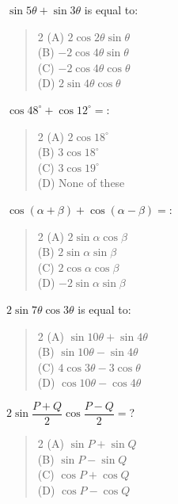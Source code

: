 \documentclass[11pt,a4paper]{article}
\begin{document}
\begin{mcqlist}
\item $\sin5\theta+\sin3\theta$ is equal to:
\begin{quote}\begin{multicols}{2}
\noindent (A) $2\cos2\theta\sin\theta$ \\
(B) $-2\cos4\theta\sin\theta$ \\
(C) $-2\cos4\theta\cos\theta$ \\
(D) $2\sin4\theta\cos\theta$
\end{multicols}\end{quote}

\item $\cos48^{\circ}+\cos12^{\circ} = $:
\begin{quote}\begin{multicols}{2}
\noindent (A) $2\cos18^{\circ}$ \\
(B) $3\cos18^{\circ}$ \\
(C) $3\cos19^{\circ}$ \\
(D) None of these
\end{multicols}\end{quote}

\item $\cos(\alpha+\beta)+\cos(\alpha-\beta) = $:
\begin{quote}\begin{multicols}{2}
\noindent (A) $2\sin\alpha\cos\beta$ \\
(B) $2\sin\alpha\sin\beta$ \\
(C) $2\cos\alpha\cos\beta$ \\
(D) $-2\sin\alpha\sin\beta$
\end{multicols}\end{quote}

\item $2\sin7\theta\cos3\theta$ is equal to:
\begin{quote}\begin{multicols}{2}
\noindent (A) $\sin10\theta+\sin4\theta$ \\
(B) $\sin10\theta-\sin4\theta$ \\
(C) $4\cos3\theta-3\cos\theta$ \\
(D) $\cos10\theta-\cos4\theta$
\end{multicols}\end{quote}

\item $2\sin\dfrac{P+Q}{2}\cos\dfrac{P-Q}{2} = $?
\begin{quote}\begin{multicols}{2}
\noindent (A) $\sin P+\sin Q$ \\
(B) $\sin P-\sin Q$ \\
(C) $\cos P+\cos Q$ \\
(D) $\cos P-\cos Q$
\end{multicols}\end{quote}


\end{mcqlist}
\end{document}
